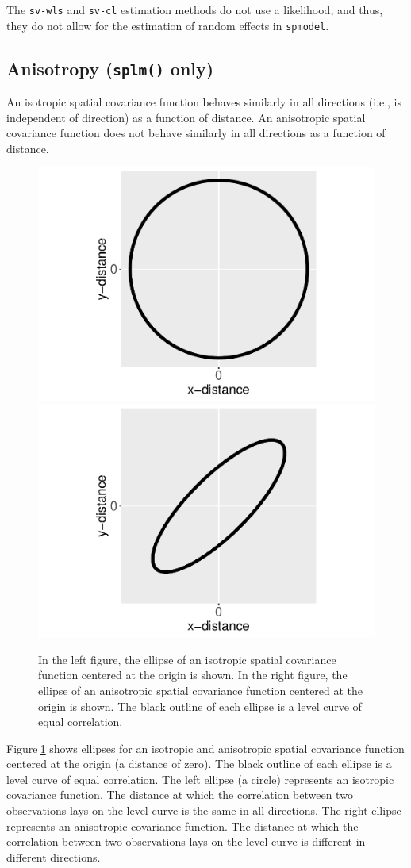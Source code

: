 \documentclass[10pt,letterpaper]{article}
\begin{document}
The \texttt{sv-wls} and \texttt{sv-cl} estimation methods do not use a
likelihood, and thus, they do not allow for the estimation of random
effects in \texttt{spmodel}.

\hypertarget{sec:anisotropy}{%
\subsection{\texorpdfstring{Anisotropy (\texttt{splm()}
only)}{Anisotropy (splm() only)}}\label{sec:anisotropy}}

An isotropic spatial covariance function behaves similarly in all
directions (i.e., is independent of direction) as a function of
distance. An anisotropic spatial covariance function does not behave
similarly in all directions as a function of distance.

\begin{figure}
\includegraphics[width=0.5\linewidth]{supplementary_files/figure-latex/anisotropy-1} \includegraphics[width=0.5\linewidth]{supplementary_files/figure-latex/anisotropy-2} \caption{In the left figure, the ellipse of an isotropic spatial covariance function centered at the origin is shown. In the right figure, the ellipse of an anisotropic spatial covariance function centered at the origin is shown. The black outline of each ellipse is a level curve of equal correlation. }\label{fig:anisotropy}
\end{figure}

Figure\(~\)\ref{fig:anisotropy} shows ellipses for an isotropic and
anisotropic spatial covariance function centered at the origin (a
distance of zero). The black outline of each ellipse is a level curve of
equal correlation. The left ellipse (a circle) represents an isotropic
covariance function. The distance at which the correlation between two
observations lays on the level curve is the same in all directions. The
right ellipse represents an anisotropic covariance function. The
distance at which the correlation between two observations lays on the
level curve is different in different directions.
\end{document}

